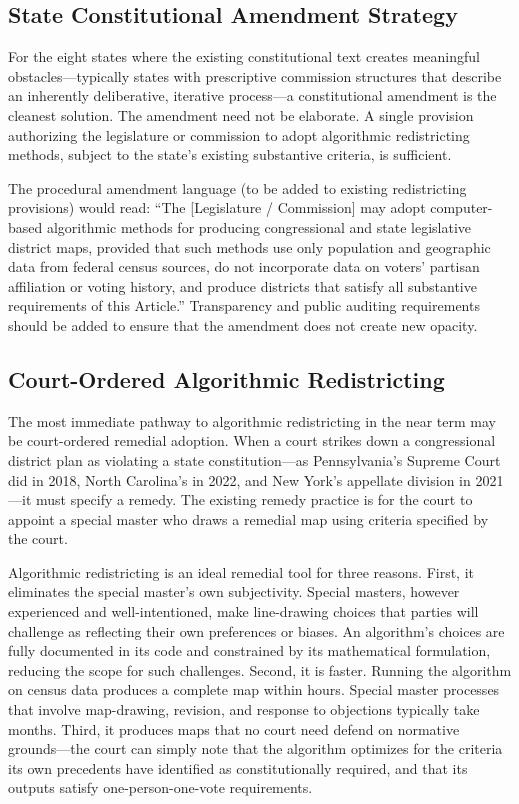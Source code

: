 \subsection{State Constitutional Amendment Strategy}

For the eight states where the existing constitutional text creates meaningful obstacles---typically states with prescriptive commission structures that describe an inherently deliberative, iterative process---a constitutional amendment is the cleanest solution. The amendment need not be elaborate. A single provision authorizing the legislature or commission to adopt algorithmic redistricting methods, subject to the state's existing substantive criteria, is sufficient.

The procedural amendment language (to be added to existing redistricting provisions) would read: ``The [Legislature / Commission] may adopt computer-based algorithmic methods for producing congressional and state legislative district maps, provided that such methods use only population and geographic data from federal census sources, do not incorporate data on voters' partisan affiliation or voting history, and produce districts that satisfy all substantive requirements of this Article.'' Transparency and public auditing requirements should be added to ensure that the amendment does not create new opacity.

\subsection{Court-Ordered Algorithmic Redistricting}

The most immediate pathway to algorithmic redistricting in the near term may be court-ordered remedial adoption. When a court strikes down a congressional district plan as violating a state constitution---as Pennsylvania's Supreme Court did in 2018, North Carolina's in 2022, and New York's appellate division in 2021---it must specify a remedy. The existing remedy practice is for the court to appoint a special master who draws a remedial map using criteria specified by the court.

Algorithmic redistricting is an ideal remedial tool for three reasons. First, it eliminates the special master's own subjectivity. Special masters, however experienced and well-intentioned, make line-drawing choices that parties will challenge as reflecting their own preferences or biases. An algorithm's choices are fully documented in its code and constrained by its mathematical formulation, reducing the scope for such challenges. Second, it is faster. Running the algorithm on census data produces a complete map within hours. Special master processes that involve map-drawing, revision, and response to objections typically take months. Third, it produces maps that no court need defend on normative grounds---the court can simply note that the algorithm optimizes for the criteria its own precedents have identified as constitutionally required, and that its outputs satisfy one-person-one-vote requirements.

